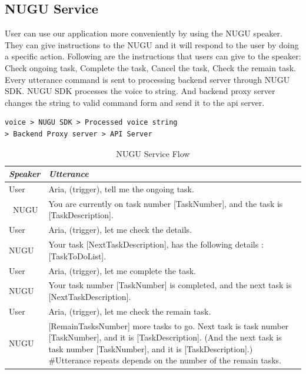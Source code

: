 \documentclass[conference]{IEEEtran}
\begin{document}
\subsection{NUGU Service}

User can use our application more conveniently by using the NUGU speaker. They can give instructions to the NUGU and it will respond to the user by doing a specific action. Following are the instructions that users can give to the speaker: Check ongoing task, Complete the task, Cancel the task, Check the remain task.\\

Every utterance command is sent to processing backend server through NUGU SDK. NUGU SDK processes the voice to string. And backend proxy server changes the string to valid command form and send it to the api server.

\begin{lstlisting}[frame=single]
voice > NUGU SDK > Processed voice string
> Backend Proxy server > API Server
\end{lstlisting}

\begin{table}[h]
\caption{NUGU Service Flow}
\begin{center}
\begin{tabular}{ | m{1cm} | m{8cm} | }
\hline
\textbf{\textit{Speaker}}& \textbf{\textit{Utterance}} \\
\hline
User & Aria, (trigger), tell me the ongoing task. \\
\hline\
NUGU & You are currently on task number [TaskNumber], and the task is [TaskDescription]. \\
\hline
User & Aria, (trigger), let me check the details. \\
\hline 
NUGU & Your task [NextTaskDescription], has the following details : [TaskToDoList]. \\
\hline
User & Aria, (trigger), let me complete the task. \\
\hline
NUGU & Your task number [TaskNumber] is completed, and the next task is [NextTaskDescription]. \\
\hline
User & Aria, (trigger), let me check the remain task. \\
\hline
NUGU & [RemainTasksNumber] more tasks to go. Next task is task number [TaskNumber], and it is [TaskDescription]. (And the next task is task number [TaskNumber], and it is [TaskDescription].) #Utterance repeats depends on the number of the remain tasks. \\
\hline
\end{tabular}
\label{tab1}
\end{center}
\end{table}
\end{document}
